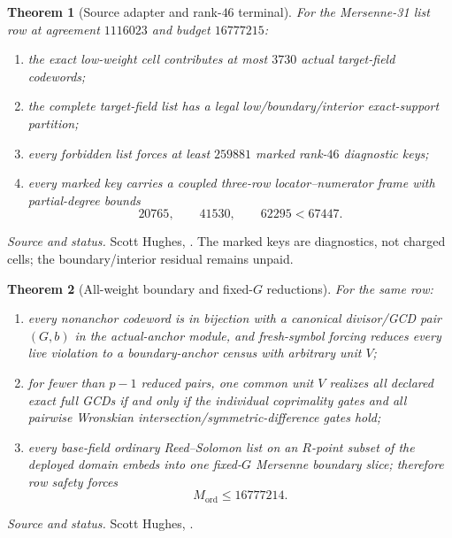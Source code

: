 \documentclass[11pt,a4paper]{amsart}
\numberwithin{equation}{section}
\newtheorem{theorem}{Theorem}[section]
\theoremstyle{remark}
\newcommand{\source}[1]{\par\smallskip\noindent\textit{Source and status.} #1\par}
\begin{document}
\begin{theorem}[Source adapter and rank-$46$ terminal]\label{thm:m31-source}
For the Mersenne-31 list row at agreement $1116023$ and budget $16777215$:
\begin{enumerate}[label=\textup{(\roman*)},leftmargin=*]
\item the exact low-weight cell contributes at most $3730$ actual target-field codewords;
\item the complete target-field list has a legal low/boundary/interior exact-support partition;
\item every forbidden list forces at least $259881$ marked rank-$46$ diagnostic keys;
\item every marked key carries a coupled three-row locator--numerator frame with partial-degree bounds
\[
 20765,
 \qquad41530,
 \qquad62295<67447.
\]
\end{enumerate}
\end{theorem}
\source{Scott Hughes, \cite{HughesM31Source26}.  The marked keys are diagnostics, not charged cells; the boundary/interior residual remains unpaid.}

\begin{theorem}[All-weight boundary and fixed-$G$ reductions]\label{thm:m31-boundary}
For the same row:
\begin{enumerate}[label=\textup{(\roman*)},leftmargin=*]
\item every nonanchor codeword is in bijection with a canonical divisor/GCD pair $(G,b)$ in the actual-anchor module, and fresh-symbol forcing reduces every live violation to a boundary-anchor census with arbitrary unit $V$;
\item for fewer than $p-1$ reduced pairs, one common unit $V$ realizes all declared exact full GCDs if and only if the individual coprimality gates and all pairwise Wronskian intersection/symmetric-difference gates hold;
\item every base-field ordinary Reed--Solomon list on an $R$-point subset of the deployed domain embeds into one fixed-$G$ Mersenne boundary slice; therefore row safety forces
\[
 M_{\mathrm{ord}}\le16777214.
\]
\end{enumerate}
\end{theorem}
\source{Scott Hughes, \cite{HughesM31Boundary26,HughesM31CRT26,HughesM31FixedG26}.}
\end{document}
